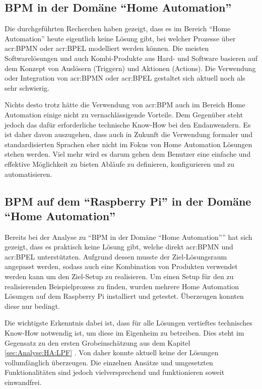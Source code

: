 \subsection{BPM in der Domäne "`Home Automation"'}
Die durchgeführten Recherchen haben gezeigt, dass es im Bereich "`Home Automation"' heute eigentlich keine Lösung gibt, bei welcher Prozesse über \gls{acr:BPMN} oder \gls{acr:BPEL} modelliert werden können. Die meisten Softwarelösungen und auch Kombi-Produkte aus Hard- und Software basieren auf dem Konzept von Auslösern (Triggern) und Aktionen (Actions). Die Verwendung oder Integration von \gls{acr:BPMN} oder \gls{acr:BPEL} gestaltet sich aktuell noch als sehr schwierig.

Nichts desto trotz hätte die Verwendung von \gls{acr:BPM} auch im Bereich Home Automation einige nicht zu vernachlässigende Vorteile. Dem Gegenüber steht jedoch das dafür erforderliche technische Know-How bei den Endanwendern. Es ist daher davon auszugehen, dass auch in Zukunft die Verwendung formaler und standardisierten Sprachen eher nicht im Fokus von Home Automation Lösungen stehen werden. Viel mehr wird es darum gehen dem Benutzer eine einfache und effektive Möglichkeit zu bieten Abläufe zu definieren, konfigurieren und zu automatisieren.

\subsection{BPM auf dem "`Raspberry Pi"' in der Domäne "`Home Automation"'}\label{subsec:Fazit:BPMN:RPI:HA}
Bereits bei der Analyse zu "`BPM in der Domäne "`Home Automation"'"' hat sich gezeigt, dass es praktisch keine Lösung gibt, welche direkt \gls{acr:BPMN} und \gls{acr:BPEL} unterstützten. Aufgrund dessen musste der Ziel-Lösungsraum angepasst werden, sodass auch eine Kombination von Produkten verwendet werden kann um den Ziel-Setup zu realisieren. Um einen Setup für den zu realisierenden Beispielprozess zu finden, wurden mehrere Home Automation Lösungen auf dem Raspberry Pi installiert und getestet. Überzeugen konnten diese nur bedingt.

Die wichtigste Erkenntnis dabei ist, dass für alle Lösungen vertieftes technisches Know-How notwendig ist, um diese im Eigenheim zu betreiben. Dies steht im Gegensatz zu den ersten Grobeinschätzung aus dem Kapitel \ref{sec:Analyse:HA:LPF} . Von daher konnte aktuell keine der Lösungen vollumfänglich überzeugen. Die einzelnen Ansätze und umgesetzten Funktionalitäten sind jedoch vielversprechend und funktionieren soweit einwandfrei. 

